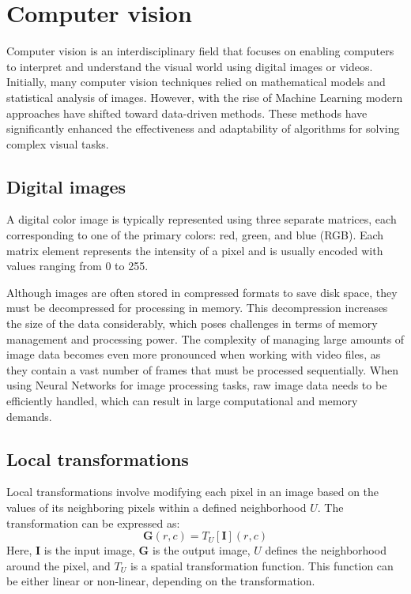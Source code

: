\section{Computer vision}

Computer vision is an interdisciplinary field that focuses on enabling computers to interpret and understand the visual world using digital images or videos. 
Initially, many computer vision techniques relied on mathematical models and statistical analysis of images. 
However, with the rise of Machine Learning modern approaches have shifted toward data-driven methods. 
These methods have significantly enhanced the effectiveness and adaptability of algorithms for solving complex visual tasks.

\subsection{Digital images}
A digital color image is typically represented using three separate matrices, each corresponding to one of the primary colors: red, green, and blue (RGB). 
Each matrix element represents the intensity of a pixel and is usually encoded with values ranging from 0 to 255.

Although images are often stored in compressed formats to save disk space, they must be decompressed for processing in memory. 
This decompression increases the size of the data considerably, which poses challenges in terms of memory management and processing power. 
The complexity of managing large amounts of image data becomes even more pronounced when working with video files, as they contain a vast number of frames that must be processed sequentially.
When using Neural Networks for image processing tasks, raw image data needs to be efficiently handled, which can result in large computational and memory demands.

\subsection{Local transformations}
Local transformations involve modifying each pixel in an image based on the values of its neighboring pixels within a defined neighborhood $U$. 
The transformation can be expressed as:
\[\mathbf{G}(r,c)=T_U[\mathbf{I}](r,c)\]
Here, $\mathbf{I}$ is the input image, $\mathbf{G}$ is the output image, $U$ defines the neighborhood around the pixel, and $T_U$ is a spatial transformation function. 
This function can be either linear or non-linear, depending on the transformation.

